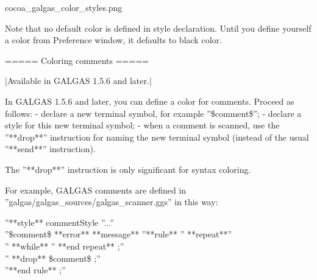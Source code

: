 {{cocoa\_galgas\_color\_styles.png}}

Note that no default color is defined in style declaration. Until you define yourself a color from Preference window, it defaults to black color.

===== Coloring comments =====

|Available in GALGAS 1.5.6 and later.|

In GALGAS 1.5.6 and later, you can define a color for comments. Proceed as follows:
  - declare a new terminal symbol, for example ''\$comment\$'';
  - declare a style for this new terminal symbol;
  - when a comment is scanned, use the ''**drop**'' instruction for naming the new terminal symbol (instead of the usual ''**send**'' instruction).

The ''**drop**'' instruction is only significant for syntax coloring.

For example, GALGAS comments are defined in ''galgas/galgas\_sources/galgas\_scanner.ggs'' in this way:

''**style** commentStyle %
''...''\\
''\$comment\$ **error** **message** %
''**rule** %
'' **repeat**''\\
'' **while** %
'' **end repeat** ;''\\
'' **drop** \$comment\$ ;''\\
''**end rule** ;''\\